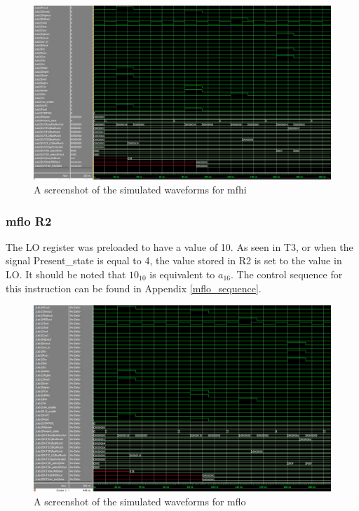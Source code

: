 \documentclass{article}
\begin{document}
                \begin{figure}[h!]
                    \begin{center}
                        \includegraphics[width=15cm]{mfhi_wave.png}
                        \caption{A screenshot of the simulated waveforms for mfhi}
                    \end{center}
                \end{figure}

        \subsubsection{mflo R2}
            The LO register was preloaded to have a value of 10. As seen in T3, or when the signal Present\_state is equal to 4, the value stored in R2 is set to the value in LO. It should be noted that $10_{10}$ is equivalent to $a_{16}$. The control sequence for this instruction can be found in Appendix \ref{mflo_sequence}.
      
                \begin{figure}[h!]
                    \begin{center}
                        \includegraphics[width=15cm]{mflo_wave.png}
                        \caption{A screenshot of the simulated waveforms for mflo}
                    \end{center}
                \end{figure}
\end{document}
